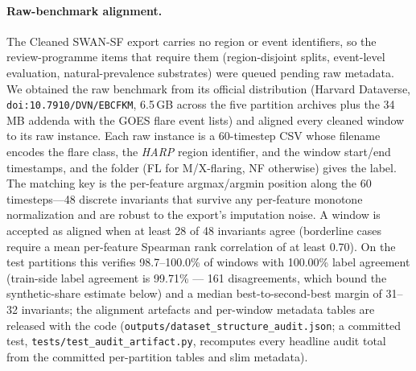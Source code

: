 \paragraph{Raw-benchmark alignment.}
The Cleaned SWAN-SF export carries no region or event identifiers, so
the review-programme items that require them (region-disjoint
splits, event-level evaluation, natural-prevalence substrates) were
queued pending raw metadata. We obtained the raw benchmark from its
official distribution (Harvard Dataverse,
\texttt{doi:10.7910/DVN/EBCFKM}, 6.5\,GB across the five partition
archives plus the 34\,MB addenda with the GOES flare event lists) and
aligned every cleaned window to its raw instance. Each raw instance is
a 60-timestep CSV whose filename encodes the flare class, the
\emph{HARP} region identifier, and the window start/end timestamps,
and the folder (FL for M/X-flaring, NF otherwise) gives the label. The
matching key is the per-feature argmax/argmin position along the 60
timesteps---48 discrete invariants that survive any per-feature
monotone normalization and are robust to the export's imputation
noise. A window is accepted as aligned when at least 28 of 48
invariants agree (borderline cases require a mean per-feature Spearman
rank correlation of at least 0.70). On the test partitions this
verifies 98.7--100.0\% of windows with 100.00\% label agreement
(train-side label agreement is 99.71\% --- 161 disagreements, which
bound the synthetic-share estimate below) and a
median best-to-second-best margin of 31--32 invariants; the alignment
artefacts and per-window metadata tables are released with the code
(\texttt{outputs/dataset\_structure\_audit.json}; a committed test,
\texttt{tests/test\_audit\_artifact.py}, recomputes every headline
audit total from the committed per-partition tables and slim
metadata).

